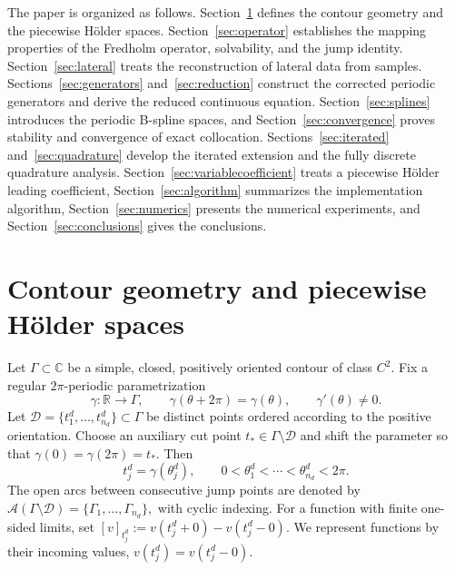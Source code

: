 \documentclass[11pt,a4paper]{amsart}
\theoremstyle{plain}
\theoremstyle{definition}
\theoremstyle{remark}
\newcommand{\Ga}{\Gamma}
\newcommand{\D}{\mathcal D}
\newcommand{\A}{\mathcal A}
\newcommand{\C}{\mathbb C}
\newcommand{\R}{\mathbb R}
\begin{document}
The paper is organized as follows.  Section~\ref{sec:spaces} defines the contour geometry and the piecewise H\"older spaces.  Section~\ref{sec:operator} establishes the mapping properties of the Fredholm operator, solvability, and the jump identity.  Section~\ref{sec:lateral} treats the reconstruction of lateral data from samples.  Sections~\ref{sec:generators} and~\ref{sec:reduction} construct the corrected periodic generators and derive the reduced continuous equation.  Section~\ref{sec:splines} introduces the periodic B-spline spaces, and Section~\ref{sec:convergence} proves stability and convergence of exact collocation.  Sections~\ref{sec:iterated} and~\ref{sec:quadrature} develop the iterated extension and the fully discrete quadrature analysis.  Section~\ref{sec:variablecoefficient} treats a piecewise H\"older leading coefficient, Section~\ref{sec:algorithm} summarizes the implementation algorithm, Section~\ref{sec:numerics} presents the numerical experiments, and Section~\ref{sec:conclusions} gives the conclusions.

\section{Contour geometry and piecewise H\"older spaces}\label{sec:spaces}

Let $\Ga\subset\C$ be a simple, closed, positively oriented contour of class $C^2$.  Fix a regular $2\pi$-periodic parametrization
\[
        \gamma:\R\to\Ga,
        \qquad \gamma(\theta+2\pi)=\gamma(\theta),
        \qquad \gamma'(\theta)\ne0.
\]
Let
$
        \D=\{t_1^d,\ldots,t_{n_d}^d\}\subset\Ga
$
be distinct points ordered according to the positive orientation.  Choose an auxiliary cut point $t_*\in\Ga\setminus\D$ and shift the parameter so that
$
        \gamma(0)=\gamma(2\pi)=t_*.
$
Then
\[
        t_j^d=\gamma(\theta_j^d),
        \qquad 0<\theta_1^d<\cdots<\theta_{n_d}^d<2\pi.
\]
The open arcs between consecutive jump points are denoted by
$
        \A(\Ga\setminus\D)=\{\Ga_1,\ldots,\Ga_{n_d}\},
$
with cyclic indexing.  For a function with finite one-sided limits, set
$
        [v]_{t_j^d}:=v(t_j^d+0)-v(t_j^d-0).
$
We represent functions by their incoming values,
$
        v(t_j^d)=v(t_j^d-0).
$
\end{document}
